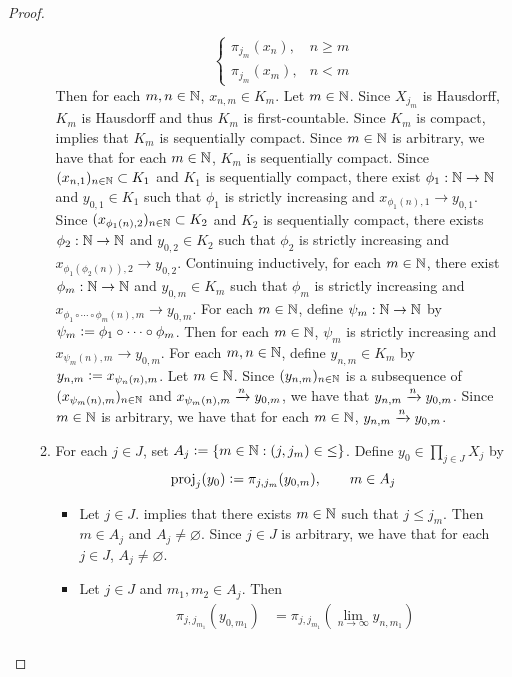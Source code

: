 \documentclass{book}
\begin{document}
\begin{proof}
\begin{enumerate}
\begin{enumerate}
\[\begin{cases}
				\pi_{j_m}(x_n), & n \geq m \\
				\pi_{j_m}(x_m), &  n < m
			\end{cases}
			\]
			Then for each $m,n \in \mathbb{N}$, $x_{n,m} \in K_m$. Let $m \in \mathbb{N}$. Since $X_{j_m}$ is Hausdorff, $K_m$ is Hausdorff and thus $K_m$ is first-countable. Since $K_m$ is compact,  implies that $K_m$ is sequentially compact. Since $m \in \mathbb{N}$ is arbitrary, we have that for each $m \in \mathbb{N}$, $K_m$ is sequentially compact. Since $(x_{n, 1})_{n \in \mathbb{N}} \subset K_1$ and $K_1$ is sequentially compact, there exist $\phi_1:\mathbb{N} \rightarrow \mathbb{N}$ and $y_{0,1} \in K_1$ such that $\phi_1$ is strictly increasing and $x_{\phi_1(n), 1} \rightarrow y_{0,1}$. Since $(x_{\phi_1(n), 2})_{n \in \mathbb{N}} \subset K_2$ and $K_2$ is sequentially compact, there exists $\phi_2:\mathbb{N} \rightarrow \mathbb{N}$ and $y_{0,2} \in K_2$ such that $\phi_2$ is strictly increasing and $x_{\phi_1( \phi_2(n)), 2} \rightarrow y_{0,2}$. Continuing inductively, for each $m \in \mathbb{N}$, there exist $\phi_m: \mathbb{N} \rightarrow \mathbb{N}$ and $y_{0,m} \in K_m$ such that $\phi_m$ is strictly increasing and $x_{\phi_1 \circ \cdots \circ \phi_m(n), m} \rightarrow y_{0, m}$. For each $m \in \mathbb{N}$, define $\psi_m: \mathbb{N} \rightarrow \mathbb{N}$ by $\psi_m \vcentcolon= \phi_1 \circ \cdots \circ \phi_m$. Then for each $m \in \mathbb{N}$, $\psi_m$ is strictly increasing and $x_{\psi_m(n), m} \rightarrow y_{0,m}$. For each $m,n \in \mathbb{N}$, define $y_{n,m} \in K_m$ by $y_{n,m} \vcentcolon= x_{\psi_n(n), m}$. Let $m \in \mathbb{N}$. Since $(y_{n,m})_{n \in \mathbb{N}}$ is a subsequence of $(x_{\psi_m(n), m})_{n \in \mathbb{N}}$ and $x_{\psi_m(n), m} \xrightarrow{n} y_{0,m}$, we have that $y_{n, m} \xrightarrow{n} y_{0, m}$. Since $m \in \mathbb{N}$ is arbitrary, we have that for each $m \in \mathbb{N}$, $y_{n,m} \xrightarrow{n} y_{0, m}$.
			\item For each $j \in J$, set $A_j \vcentcolon= \{m \in \mathbb{N}: (j, j_m) \in {\leq}\}$. Define $y_0 \in \prod\limits_{j \in J} X_j$ by 
			$$\operatorname{\text{proj}}_j(y_0) \vcentcolon= \pi_{j,j_m}(y_{0, m}), \quad \quad m \in A_j$$ 
			\begin{itemize} 
				\item Let $j \in J$.  implies that there exists $m \in \mathbb{N}$ such that $j \leq j_m$. Then $m \in A_j$ and $A_j \neq \varnothing$. Since $j \in J$ is arbitrary, we have that for each $j \in J$, $A_j \neq \varnothing$.
				\item  Let $j \in J$ and $m_1, m_2 \in A_j$. Then 
				\begin{align*}
					\pi_{j,j_{m_1}}(y_{0,m_1})
					& = \pi_{j, j_{m_1}}(\lim\limits_{n \rightarrow \infty} y_{n,m_1}) \\

\end{align*}
\end{itemize}
\end{enumerate}
\end{enumerate}
\end{proof}
\end{document}

